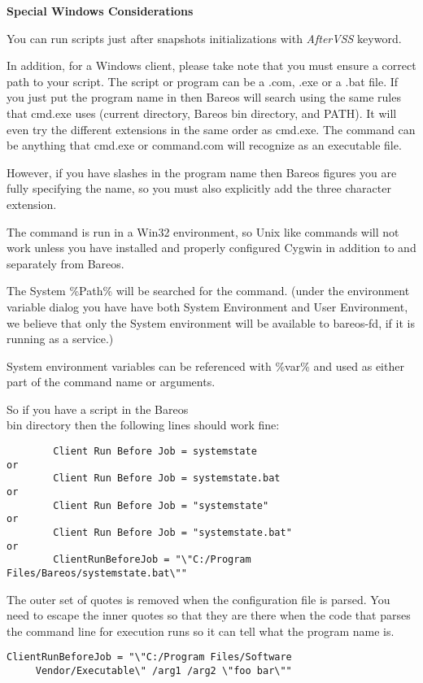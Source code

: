 \begin{description}
{\bf Special Windows Considerations}

You can run scripts just after snapshots initializations with
\textsl{AfterVSS} keyword.

In addition, for a Windows client, please take
note that you must ensure a correct path to your script.  The script or
program can be a .com, .exe or a .bat file.  If you just put the program
name in then Bareos will search using the same rules that cmd.exe uses
(current directory, Bareos bin directory, and PATH).  It will even try the
different extensions in the same order as cmd.exe.
The command can be anything that cmd.exe or command.com will recognize
as an executable file.

However, if you have slashes in the program name then Bareos figures you
are fully specifying the name, so you must also explicitly add the three
character extension.

The command is run in a Win32 environment, so Unix like commands will not
work unless you have installed and properly configured Cygwin in addition
to and separately from Bareos.

The System \%Path\% will be searched for the command.  (under the
environment variable dialog you have have both System Environment and
User Environment, we believe that only the System environment will be
available to bareos-fd, if it is running as a service.)

System environment variables can be referenced with \%var\% and
used as either part of the command name or arguments.

So if you have a script in the Bareos\\bin directory then the following lines
should work fine:

\footnotesize
\begin{verbatim}
        Client Run Before Job = systemstate
or
        Client Run Before Job = systemstate.bat
or
        Client Run Before Job = "systemstate"
or
        Client Run Before Job = "systemstate.bat"
or
        ClientRunBeforeJob = "\"C:/Program Files/Bareos/systemstate.bat\""
\end{verbatim}
\normalsize

The outer set of quotes is removed when the configuration file is parsed.
You need to escape the inner quotes so that they are there when the code
that parses the command line for execution runs so it can tell what the
program name is.

\footnotesize
\begin{verbatim}
ClientRunBeforeJob = "\"C:/Program Files/Software
     Vendor/Executable\" /arg1 /arg2 \"foo bar\""
\end{verbatim}
\normalsize


\end{description}
